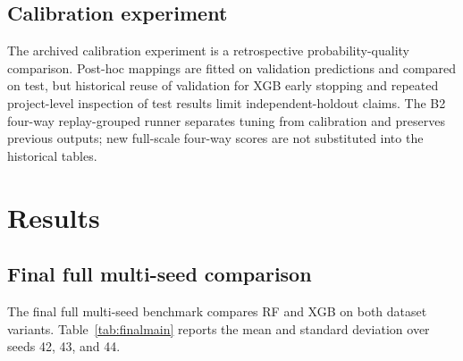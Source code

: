 \documentclass[11pt,a4paper]{article}
\begin{document}
\subsection{Calibration experiment}
The archived calibration experiment is a retrospective probability-quality comparison. Post-hoc mappings are fitted on validation predictions and compared on test, but historical reuse of validation for XGB early stopping and repeated project-level inspection of test results limit independent-holdout claims. The B2 four-way replay-grouped runner separates tuning from calibration and preserves previous outputs; new full-scale four-way scores are not substituted into the historical tables.


\section{Results}
\subsection{Final full multi-seed comparison}
The final full multi-seed benchmark compares RF and XGB on both dataset variants. Table~\ref{tab:finalmain} reports the mean and standard deviation over seeds 42, 43, and 44.

\begin{table}[H]
\centering
\caption{Final full multi-seed benchmark. Mean $\pm$ standard deviation over seeds 42, 43, and 44.}
\label{tab:finalmain}
\small
{}
\normalsize
\end{table}
\end{document}
